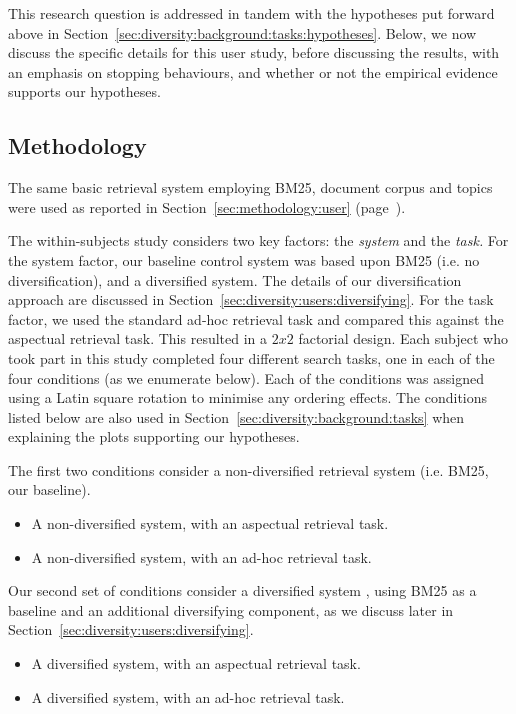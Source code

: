This research question is addressed in tandem with the hypotheses put forward above in Section~\ref{sec:diversity:background:tasks:hypotheses}. Below, we now discuss the specific details for this user study, before discussing the results, with an emphasis on stopping behaviours, and whether or not the empirical evidence supports our hypotheses.

\subsection{Methodology}\label{sec:diversity:users:method}
The same basic retrieval system employing BM25, document corpus and topics were used as reported in Section~\ref{sec:methodology:user} (page~\pageref{sec:methodology:user}).

The within-subjects study considers two key factors: the \emph{system} and the \emph{task.} For the system factor, our baseline control system was based upon BM25 (i.e. no diversification), and a diversified system. The details of our diversification approach are discussed in Section~\ref{sec:diversity:users:diversifying}. For the task factor, we used the standard ad-hoc retrieval task and compared this against the aspectual retrieval task. This resulted in a $2x2$ factorial design. Each subject who took part in this study completed four different search tasks, one in each of the four conditions (as we enumerate below). Each of the conditions was assigned using a Latin square rotation to minimise any ordering effects. The conditions listed below are also used in Section~\ref{sec:diversity:background:tasks} when explaining the plots supporting our hypotheses.

The first two conditions consider a non-diversified retrieval system  (i.e. BM25, our baseline).

\begin{itemize}
    \item{ A non-diversified system, with an aspectual retrieval task.}
    \item{ A non-diversified system, with an ad-hoc retrieval task.}
\end{itemize}

Our second set of conditions consider a diversified system , using BM25 as a baseline and an additional diversifying component, as we discuss later in Section~\ref{sec:diversity:users:diversifying}.

\begin{itemize}
    \item{ A diversified system, with an aspectual retrieval task.}
    \item{ A diversified system, with an ad-hoc retrieval task.}
\end{itemize}

